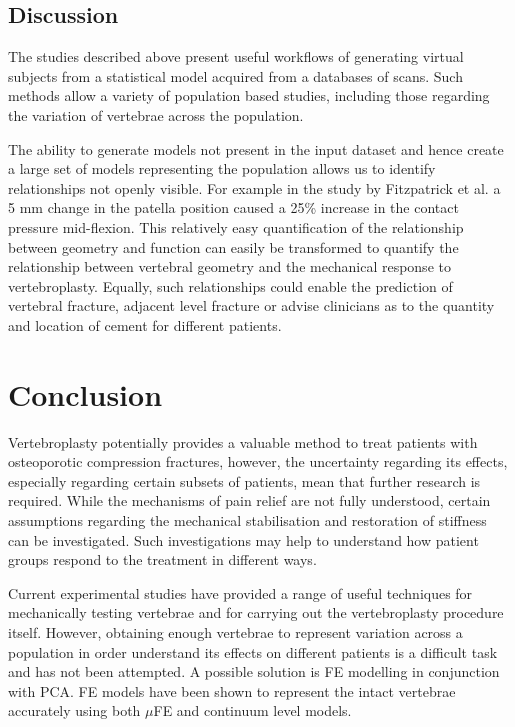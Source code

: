 \subsection{Discussion}\label{discussion}

The studies described above present useful workflows of generating
virtual subjects from a statistical model acquired from a databases of
scans. Such methods allow a variety of population based studies,
including those regarding the variation of vertebrae across the
population.

The ability to generate models not present in the input dataset and
hence create a large set of models representing the population allows us
to identify relationships not openly visible. For example in the study
by Fitzpatrick et al. \cite{Fitzpatrick2011} a 5 mm change in the patella
position
caused a 25\% increase in the contact pressure mid-flexion. This
relatively easy quantification of the relationship between geometry and
function can easily be transformed to quantify the relationship between
vertebral geometry and the mechanical response to vertebroplasty.
Equally, such relationships could enable the prediction of vertebral
fracture, adjacent level fracture or advise clinicians as to the
quantity and location of cement for different patients.


\section{Conclusion}

Vertebroplasty potentially provides a valuable method to treat patients with osteoporotic compression fractures, however, the uncertainty regarding its effects, especially regarding certain subsets of patients, mean that further research is required. While the mechanisms of pain relief are not fully understood, certain assumptions regarding the mechanical stabilisation and restoration of stiffness can be investigated. Such investigations may help to understand how patient groups respond to the
treatment in different ways.

Current experimental studies have provided a range of useful techniques for mechanically testing vertebrae and for carrying out the vertebroplasty procedure itself. However, obtaining enough vertebrae to represent variation across a population in order understand its effects on different patients is a difficult task and has not been attempted. A possible solution is FE modelling in conjunction with PCA. FE models have been shown to represent the intact vertebrae accurately using both $\mu$FE and continuum level models.

